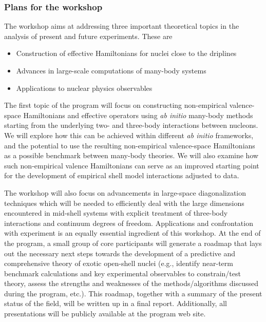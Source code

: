 \documentclass{beamer}
\begin{document}
\begin{frame}
\frametitle{Plans for the workshop}

\begin{block}{}
The workshop aims at addressing three important theoretical topics in the analysis
of present and future experiments.  These are
\begin{itemize}
\item Construction of effective Hamiltonians for nuclei close to the driplines

\item Advances in large-scale computations of many-body systems

\item Applications to nuclear physics observables
\end{itemize}

\noindent
The first topic of the program will focus on constructing non-empirical 
valence-space Hamiltonians and effective operators using \emph{ab initio} 
many-body methods starting from the underlying two- and three-body interactions 
between nucleons. We will explore how this can be achieved within different  \emph{ab initio} frameworks, and the potential to use the resulting non-empirical
valence-space Hamiltonians as a possible benchmark between many-body 
theories. We will also examine how such non-empirical valence Hamiltonians can 
serve as an improved starting point for the development of empirical shell model 
interactions adjusted to data. 

The workshop will also focus on advancements in large-space diagonalization techniques which will be needed to efficiently 
deal with the large dimensions encountered in mid-shell systems with explicit treatment of three-body interactions and continuum degrees of freedom. Applications and confrontation with experiment is an equally essential ingredient of this workshop.
At the end of the program, a small group of core participants will generate a roadmap that lays out the necessary next steps towards the development of a predictive and comprehensive theory of exotic open-shell nuclei (e.g., identify near-term benchmark calculations and key experimental observables to constrain/test theory, assess the strengths and weaknesses of the methods/algorithms discussed during the program, etc.). This roadmap, together with a summary of the present status of the field, will be written up in a final report. Additionally, all presentations will be publicly available at the program web site. 
\end{block}
\end{frame}
\end{document}
